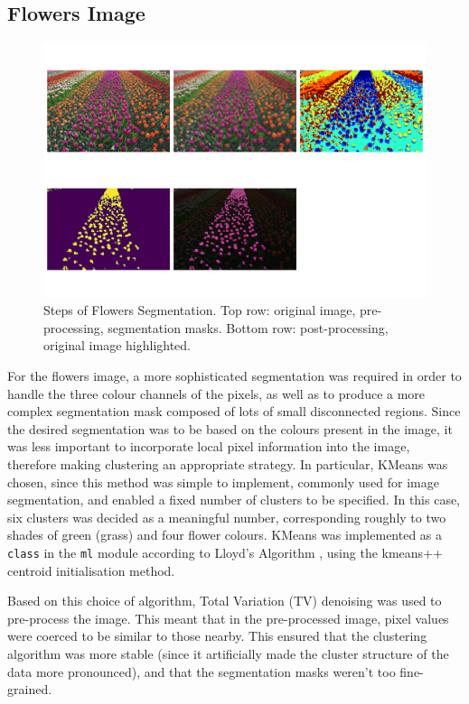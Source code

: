 \documentclass[12pt]{article}
\begin{document}
\subsection{Flowers Image}

\begin{figure}[htp]
    \includegraphics[scale=0.35, center]{figures/flowers_segmentation.png}
    \caption{Steps of Flowers Segmentation. Top row: original image, pre-processing, segmentation masks. Bottom row: post-processing, original image highlighted.}
    \label{fig:flowers}
\end{figure}

For the flowers image, a more sophisticated segmentation was required in order to handle the three colour channels of the pixels,
as well as to produce a more complex segmentation mask composed of lots of small disconnected regions.
Since the desired segmentation was to be based on the colours present in the image,
it was less important to incorporate local pixel information into the image,
therefore making clustering an appropriate strategy.
In particular, KMeans was chosen, since this method was simple to implement,
commonly used for image segmentation,
and enabled a fixed number of clusters to be specified.
In this case, six clusters was decided as a meaningful number,
corresponding roughly to two shades of green (grass) and four flower colours.
KMeans was implemented as a \texttt{class} in the \texttt{ml} module according to Lloyd's Algorithm \cite{lloyd},
using the kmeans++ \cite{kmeanspp} centroid initialisation method.

Based on this choice of algorithm, Total Variation (TV) denoising was used to pre-process the image.
This meant that in the pre-processed image, pixel values were coerced to be similar to those nearby.
This ensured that the clustering algorithm was more stable (since it artificially made the cluster structure of the data more pronounced),
and that the segmentation masks weren't too fine-grained.
\end{document}
